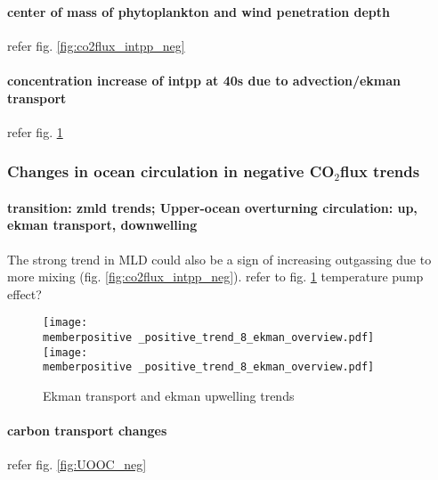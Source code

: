 \documentclass[12pt]{article}
\newcommand{\memberpositive}{m178_1985_1992} %
\begin{document}
\paragraph{center of mass of phytoplankton and wind penetration depth}
refer fig. \ref{fig:co2flux_intpp_neg} 



\paragraph{concentration increase of intpp at 40s due to advection/ekman transport} refer fig. \ref{fig:ekman_neg}



\clearpage



\subsubsection{Changes in ocean circulation in negative CO$_2$flux trends}

\paragraph{transition: zmld trends; Upper-ocean overturning circulation: up, ekman transport, downwelling} The strong trend in MLD could also be a sign of increasing outgassing due to more mixing (fig. \ref{fig:co2flux_intpp_neg}). refer to fig. \ref{fig:ekman_neg}
temperature pump effect?

\begin{figure}[h!]
	\centering
	\texttt{[image: \\memberpositive \_positive\_trend\_8\_ekman\_overview.pdf]}
	\texttt{[image: \\memberpositive \_positive\_trend\_8\_ekman\_overview.pdf]}
	\caption{Ekman transport and ekman upwelling trends}
	\label{fig:ekman_neg}
\end{figure}


\paragraph{carbon transport changes}
refer fig. \ref{fig:UOOC_neg}
\end{document}
